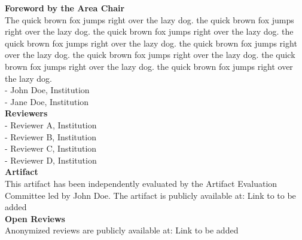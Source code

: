 \maketitle

\parbox{\textwidth}{%
    \vspace{5pt}
    {\Large \bf Foreword by the Area Chair}\\
    
    The quick brown fox jumps right over the lazy dog. the quick brown fox jumps right over the lazy dog. the quick brown fox jumps right over the lazy dog. the quick brown fox jumps right over the lazy dog. the quick brown fox jumps right over the lazy dog. the quick brown fox jumps right over the lazy dog. the quick brown fox jumps right over the lazy dog. the quick brown fox jumps right over the lazy dog.\\

    - John Doe, Institution\\
    - Jane Doe, Institution\\

    {\Large \bf Reviewers}\\

    - Reviewer A, Institution\\
    - Reviewer B, Institution\\
    - Reviewer C, Institution\\
    - Reviewer D, Institution\\
    
    {\Large \bf Artifact}\\

    This artifact has been independently evaluated by the Artifact Evaluation Committee led by
    John Doe.
    The artifact is publicly available at: Link to to be added\\

    {\Large \bf Open Reviews}\\

    Anonymized reviews are publicly available at: Link to be added\\
    
  }%



